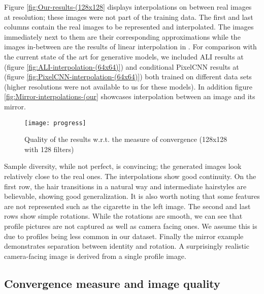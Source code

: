 \documentclass[english]{article}
\begin{document}
Figure \ref{fig:Our-results-(128x128} displays interpolations on
 between real images at  resolution; these
images were not part of the training data. The first and last columns
contain the real images to be represented and interpolated. The images
immediately next to them are their corresponding approximations while
the images in-between are the results of linear interpolation in .
For comparison with the current state of the art for generative models,
we included ALI \cite{dumoulin2016adversarially} results at 
(figure \ref{fig:ALI-interpolation-(64x64)}) and conditional PixelCNN
\cite{oord2016conditional} results at  (figure \ref{fig:PixelCNN-interpolation-(64x64)})
both trained on different data sets (higher resolutions were not available
to us for these models). In addition figure \ref{fig:Mirror-interpolations-(our}
showcases interpolation between an image and its mirror.

\begin{figure}[b]
\centering{}\texttt{[image: progress]}\caption{Quality of the results w.r.t. the measure of convergence (128x128
with 128 filters)\label{fig:convqual}}
\end{figure}
Sample diversity, while not perfect, is convincing; the generated
images look relatively close to the real ones. The interpolations
show good continuity. On the first row, the hair transitions in a
natural way and intermediate hairstyles are believable, showing good
generalization. It is also worth noting that some features are not
represented such as the cigarette in the left image. The second and
last rows show simple rotations. While the rotations are smooth, we
can see that profile pictures are not captured as well as camera facing
ones. We assume this is due to profiles being less common in our dataset.
Finally the mirror example demonstrates separation between identity
and rotation. A surprisingly realistic camera-facing image is derived
from a single profile image.


\subsection{Convergence measure and image quality}
\end{document}
